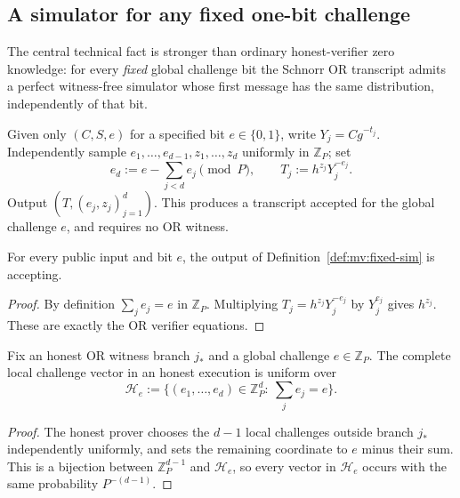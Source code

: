 \subsection{A simulator for any fixed one-bit challenge}\label{sec:mv:fixed}
The central technical fact is stronger than ordinary
honest-verifier zero knowledge: for every \emph{fixed}
global challenge bit the Schnorr OR transcript admits
a perfect witness-free simulator whose first message
has the same distribution, independently of that bit.

\begin{definition}\label{def:mv:fixed-sim}
Given only $(C,S,e)$ for a specified bit $e\in\{0,1\}$,
write $Y_j=Cg^{-t_j}$. Independently sample
$e_1,\dots,e_{d-1},z_1,\dots,z_d$
uniformly in $\mathbb Z_P$; set
\[
 e_d:=e-\sum_{j<d}e_j\pmod P,\qquad
 T_j:=h^{z_j}Y_j^{-e_j}.
\]
Output $(T,(e_j,z_j)_{j=1}^d)$.
This produces a transcript accepted for the global
challenge $e$, and requires no OR witness.
\end{definition}

\begin{lemma}\label{lem:mv:fixed-accepts}
For every public input and bit $e$, the output of
Definition~\ref{def:mv:fixed-sim} is accepting.
\end{lemma}
\begin{proof}
By definition $\sum_je_j=e$ in $\mathbb Z_P$.
Multiplying $T_j=h^{z_j}Y_j^{-e_j}$
by $Y_j^{e_j}$ gives $h^{z_j}$.
These are exactly the OR verifier equations.
\end{proof}

\begin{lemma}\label{lem:mv:local-hyperplane}
Fix an honest OR witness branch $j_*$ and a
global challenge $e\in\mathbb Z_P$.
The complete local challenge vector in an honest
execution is uniform over
\[
 \mathcal H_e:=\{(e_1,\dots,e_d)\in
 \mathbb Z_P^d:\ \sum_je_j=e\}.
\]
\end{lemma}
\begin{proof}
The honest prover chooses the $d-1$ local
challenges outside branch $j_*$ independently
uniformly, and sets the remaining coordinate
to $e$ minus their sum. This is a bijection
between $\mathbb Z_P^{d-1}$ and $\mathcal H_e$,
so every vector in $\mathcal H_e$ occurs with
the same probability $P^{-(d-1)}$.
\end{proof}

